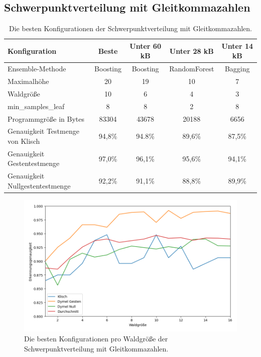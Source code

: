 \subsection{Schwerpunktverteilung mit Gleitkommazahlen}
\begin{table}[h!]
    \hspace{-0.5cm}
    \begin{tabular}{ | l | c | c | c | c |}
        \hline
        Konfiguration & Beste & Unter 60 kB & Unter 28 kB & Unter 14 kB \\\hline
        Ensemble-Methode & Boosting & Boosting & RandomForest & Bagging  \\\hline
        Maximalhöhe & 20 & 19 & 10 & 7 \\\hline
        Waldgröße & 10 & 6 & 4 & 3 \\\hline
        min\_samples\_leaf & 8 & 8 & 2 & 8 \\\hline
        Programmgröße in Bytes & 83304 & 43678 & 20188 & 6656 \\\hline
        Genauigkeit Testmenge von Klisch & 94,8\% & 94.8\% & 89,6\% & 87,5\% \\\hline
        Genauigkeit Gestentestmenge & 97,0\% & 96,1\% & 95,6\% & 94,1\% \\\hline
        Genauigkeit Nullgestentestmenge & 92,2\% & 91,1\% & 88,8\% & 89,9\% \\\hline
    \end{tabular}
    \caption{Die besten Konfigurationen der Schwerpunktverteilung mit Gleitkommazahlen.}
    \label{tab:schwerpunktverteilung_float}
\end{table}
\begin{figure}[h!]
    \centering
    \includegraphics[width=\linewidth]{images/cocd_float_acc_per_size.png}
    \caption{Die besten Konfigurationen pro Waldgröße der Schwerpunktverteilung mit Gleitkommazahlen.}
    \label{fig:cocd_float_per_forest_size}
\end{figure}
